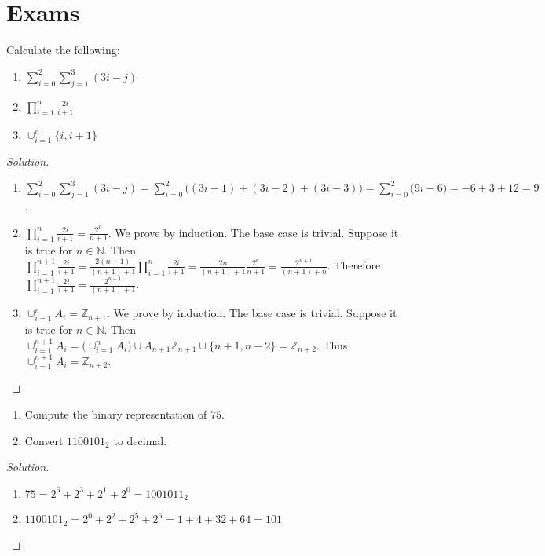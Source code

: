     \section{Exams}
        \begin{problem}
        Calculate the following:
        \begin{enumerate}
            \item $\sum_{i=0}^{2}\sum_{j=1}^{3}(3i-j)$
            \item $\prod_{i=1}^{n} \frac{2i}{i+1}$
            \item $\cup_{i=1}^{n} \{i,i+1\}$
        \end{enumerate}
        \end{problem}
        \begin{proof}[Solution]
        \par
        \begin{enumerate}
            \item $\sum_{i=0}^{2}\sum_{j=1}^{3}(3i-j)=\sum_{i=0}^{2}\big((3i-1)+(3i-2)+(3i-3)\big)=\sum_{i=0}^{2}\big(9i-6\big)=-6+3+12=9$.
            \item   $\prod_{i=1}^{n} \frac{2i}{i+1}= \frac{2^n}{n+1}$. We prove
                    by induction. The base case is trivial. Suppose it is true
                    for $n\in \mathbb{N}$. Then $\prod_{i=1}^{n+1} \frac{2i}{i+1} = \frac{2(n+1)}{(n+1)+1}\prod_{i=1}^{n}\frac{2i}{i+1}=\frac{2n}{(n+1)+1}\frac{2^n}{n+1} = \frac{2^{n+1}}{(n+1)+n}$. Therefore $\prod_{i=1}^{n+1} \frac{2i}{i+1} = \frac{2^{n+1}}{(n+1)+1}$.
            \item $\cup_{i=1}^{n} A_i = \mathbb{Z}_{n+1}$. We prove by induction. The base case is trivial. Suppose it is true for $n\in \mathbb{N}$. Then $\cup_{i=1}^{n+1}A_i = \big(\cup_{i=1}^{n}A_{i}\big) \cup A_{n+1}\mathbb{Z}_{n+1}\cup\{n+1,n+2\}=\mathbb{Z}_{n+2}$. Thus $\cup_{i=1}^{n+1} A_{i} = \mathbb{Z}_{n+2}$.
        \end{enumerate}
        \end{proof}
        \begin{problem}
        \par
        \begin{enumerate}
            \item Compute the binary representation of $75$.
            \item Convert $1100101_2$ to decimal.
        \end{enumerate}
        \end{problem}
        \begin{proof}[Solution]
        \par
        \begin{enumerate}
            \item $75=2^{6}+2^{3}+2^{1}+2^{0}=1001011_{2}$
            \item $1100101_{2}=2^{0}+2^{2}+2^{5}+2^{6}=1+4+32+64=101$
        \end{enumerate}
        \end{proof}

